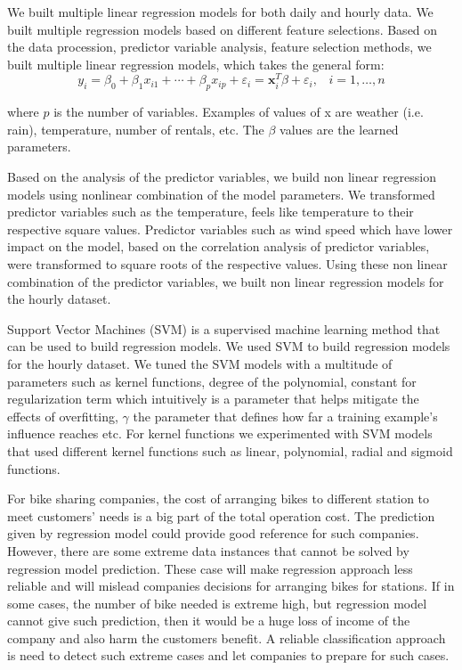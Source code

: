 \documentclass[12pt]{article}
\begin{document}


We built multiple linear regression models for both daily and hourly data. We
built multiple regression models based on different feature selections.  Based
on the data procession, predictor variable analysis, feature selection methods,
we built multiple linear regression models, which takes the general form:
\begin{equation}
y_i = \beta_0 + \beta_1x_{i1} + \cdots + \beta_px_{ip} + \varepsilon_i = {\mathbf
x}_i^{T}\beta + \varepsilon_i, \; \; \; i = 1, \ldots, n
\end{equation}

where $p$ is the number of variables. Examples of values of x are weather
(i.e. rain), temperature, number of rentals, etc. The $\beta$ values are the
learned parameters.



Based on the analysis of the predictor variables, we build non linear
regression models using nonlinear combination of the model parameters. We
transformed predictor variables such as the temperature, feels like temperature
to their respective square values. Predictor variables such as wind speed which
have lower impact on the model, based on the correlation analysis of predictor
variables, were transformed to square roots of the respective values.  Using
these non linear combination of the predictor variables, we built non linear
regression models for the hourly dataset.



Support Vector Machines (SVM) is a supervised machine learning method that can
be used to build regression models.  We used SVM to build regression models for
the hourly dataset. We tuned the SVM models with a multitude of parameters such
as kernel functions, degree of the polynomial, constant for regularization term
which intuitively is a parameter that helps mitigate the effects of
overfitting, $\gamma$ the parameter that defines how far a training example's
influence reaches etc. For kernel functions we experimented with SVM models
that used different kernel functions such as linear, polynomial, radial and
sigmoid functions.



For bike sharing companies, the cost of arranging bikes to different station to
meet customers’ needs is a big part of the total operation cost. The prediction
given by regression model could provide good reference for such
companies. However, there are some extreme data instances that cannot be solved
by regression model prediction. These case will make regression approach less
reliable and will mislead companies decisions for arranging bikes for
stations. If in some cases, the number of bike needed is extreme high, but
regression model cannot give such prediction, then it would be a huge loss of
income of the company and also harm the customers benefit.  A reliable
classification approach is need to detect such extreme cases and let companies
to prepare for such cases.
\end{document}
